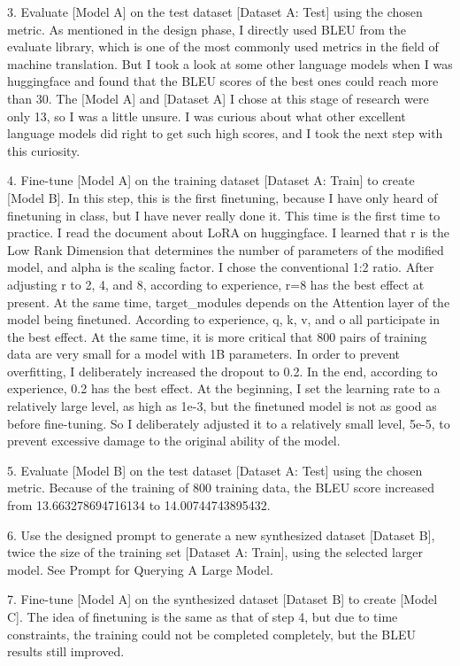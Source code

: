 3. Evaluate [Model A] on the test dataset [Dataset A: Test] using the chosen metric.
As mentioned in the design phase, I directly used BLEU from the evaluate library, 
which is one of the most commonly used metrics in the field of machine translation.
But I took a look at some other language models 
when I was huggingface and found that the BLEU scores of the best ones could reach more than 30. 
The [Model A] and [Dataset A] I chose at this stage of research were only 13, so I was a little unsure.
I was curious about what other excellent language models did right to get such high scores, 
and I took the next step with this curiosity.

4. Fine-tune [Model A] on the training dataset [Dataset A: Train] to create [Model B].
In this step, this is the first fine\-tuning, because I have only heard of fine\-tuning in class, 
but I have never really done it. This time is the first time to practice. I read the document about LoRA on huggingface.
I learned that r is the Low Rank Dimension that determines the number of parameters of the modified model, 
and alpha is the scaling factor. I chose the conventional 1:2 ratio. After adjusting r to 2, 4, and 8, according to experience, 
r=8 has the best effect at present. At the same time, target\_modules depends on the Attention layer of the model being fine\-tuned. 
According to experience, q, k, v, and o all participate in the best effect. 
At the same time, it is more critical that 800 pairs of training data are very small for a model with 1B parameters. 
In order to prevent overfitting, I deliberately increased the dropout to 0.2. In the end, according to experience, 
0.2 has the best effect. At the beginning, I set the learning rate to a relatively large level, as high as 1e-3, 
but the fine\-tuned model is not as good as before fine-tuning. So I deliberately adjusted it to a relatively small level, 
5e-5, to prevent excessive damage to the original ability of the model.

5. Evaluate [Model B] on the test dataset [Dataset A: Test] using the chosen metric.
Because of the training of 800 training data, the BLEU score increased from 13.663278694716134 to 14.00744743895432.

6. Use the designed prompt to generate a new synthesized dataset [Dataset B],
twice the size of the training set [Dataset A: Train], using the selected larger model.
See Prompt for Querying A Large Model.

7. Fine-tune [Model A] on the synthesized dataset [Dataset B] to create [Model C].
The idea of fine\-tuning is the same as that of step 4, but due to time constraints, 
the training could not be completed completely, but the BLEU results still improved.

